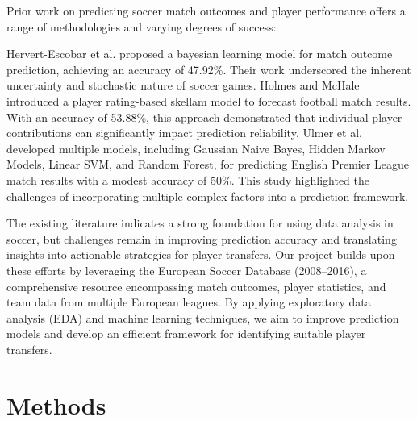 \documentclass{article}
\begin{document}
Prior work on predicting soccer match outcomes and player performance offers a range of methodologies and varying degrees of success:

Hervert-Escobar et al. \cite{hervert2018} proposed a bayesian learning model for match outcome prediction, achieving an accuracy of 47.92\%. Their work underscored the inherent uncertainty and stochastic nature of soccer games. Holmes and McHale \cite{holmes2024} introduced a player rating-based skellam model to forecast football match results. With an accuracy of 53.88\%, this approach demonstrated that individual player contributions can significantly impact prediction reliability. Ulmer et al. \cite{ulmer2013} developed multiple models, including Gaussian Naive Bayes, Hidden Markov Models, Linear SVM, and Random Forest, for predicting English Premier League match results with a modest accuracy of 50\%. This study highlighted the challenges of incorporating multiple complex factors into a prediction framework. 


The existing literature indicates a strong foundation for using data analysis in soccer, but challenges remain in improving prediction accuracy and translating insights into actionable strategies for player transfers. Our project builds upon these efforts by leveraging the European Soccer Database (2008--2016), a comprehensive resource encompassing match outcomes, player statistics, and team data from multiple European leagues. By applying exploratory data analysis (EDA) and machine learning techniques, we aim to improve prediction models and develop an efficient framework for identifying suitable player transfers.

\section{Methods}
\end{document}
